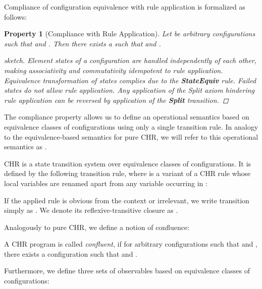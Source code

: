 \documentclass[acmtocl]{acmtrans2m}
\newtheorem{property}[theorem]{Property}
\begin{document}
Compliance of configuration equivalence with rule application is formalized as
follows:

\begin{property}[Compliance with Rule Application] Let
 be arbitrary configurations such that  and
. Then there exists a  such that  and
. \begin{proof}[sketch] Element states of a configuration
are handled independently of each other, making associativity and commutativity
idempotent to rule application. Equivalence transformation of states complies due
to the \textbf{StateEquiv} rule. Failed states do not allow rule
application. Any application of the
\emph{Split} axiom hindering rule application can be reversed by application of
the \textbf{Split} transition.
\end{proof}
\end{property}

The compliance property allows us to define an operational semantics based on
equivalence classes of configurations using only a single transition rule. In
analogy to the equivalence-based semantics  for pure CHR, we will refer
to this operational semantics as .

\begin{definition}
\label{def:vee-tr-system}
CHR is a state transition system over equivalence classes of configurations. It
is defined by the following transition rule, where  is a variant of a CHR rule whose local variables
 are renamed apart from any variable occurring in :

\medskip


\medskip
If the applied rule is obvious from the context or irrelevant, we write
transition simply as . We denote its reflexive-transitive closure
as .
\end{definition}

Analogously to pure CHR, we define a notion of confluence:

\begin{definition}[Confluence]
\label{def:vee-confluence}
A CHR program  is called \emph{confluent}, if for arbitrary
configurations  such that  and
, there exists a configuration  such that
 and .
\end{definition}

Furthermore, we define three sets of observables based on equivalence classes of
configurations:
\end{document}
